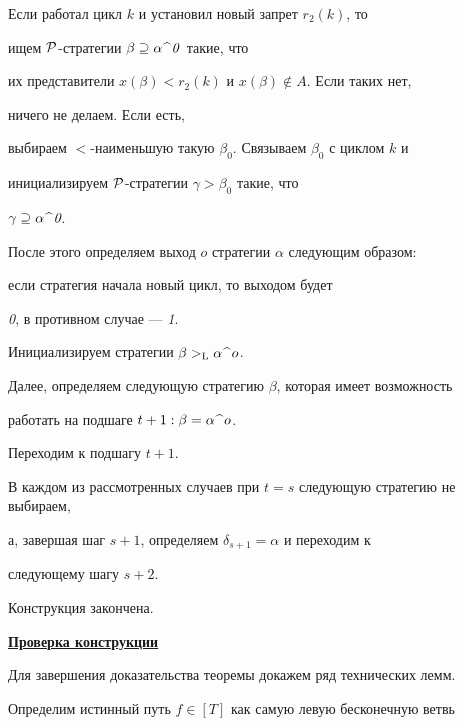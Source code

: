 Если работал цикл $k$ и установил новый запрет $r_2(k)$, то


ищем $\cal P$-стратегии $\beta\supseteq\alpha\,\widehat{\ }\,{\it 0\/}$ такие, что


их представители $x(\beta)<r_2(k)$ и $x(\beta)\not\in A$. Если таких нет,


ничего не делаем. Если есть,


выбираем $<$-наименьшую такую $\beta_0$. Связываем $\beta_0$ с циклом $k$ и


инициализируем $\cal P$-стратегии $\gamma>\beta_0$ такие, что


$\gamma\supseteq\alpha\,\widehat{\ }\,\text{\it 0}$.


После этого определяем выход $o$ стратегии $\alpha$ следующим образом:


если стратегия начала новый цикл, то выходом будет


{\it 0}, в противном случае --- {\it 1}.


Инициализируем стратегии $\beta>_{\mathrm L}\alpha\,\widehat{\ }\,o$.


Далее, определяем следующую стратегию $\beta$, которая имеет возможность


работать на подшаге $t+1 : \beta=\alpha\,\widehat{\ }\,o$.


Переходим к подшагу $t+1$.





В каждом из рассмотренных случаев при $t=s$ следующую стратегию не выбираем,


а, завершая шаг $s+1$, определяем $\delta_{s+1}=\alpha$ и переходим к


следующему шагу $s+2$.





\noindent Конструкция закончена.





\medskip


\underline{\bf Проверка конструкции}


\medskip


   


\noindent Для завершения доказательства теоремы докажем ряд технических лемм.


\addtocounter{section}{-2}


 


Определим истинный путь $f\in [T]$ как самую левую бесконечную ветвь


